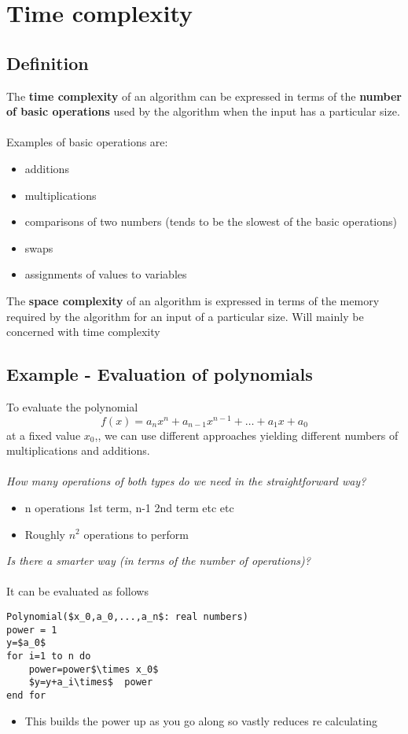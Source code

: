 \documentclass{article}[18pt]
\begin{document}
\section{Time complexity}
\subsection{Definition}
The \textbf{time complexity} of an algorithm can be expressed in terms
of the \textbf{number of basic operations} used by the algorithm when
the input has a particular size.\\
\\
Examples of basic operations are:
\begin{itemize}
	\item additions
	\item multiplications
	\item comparisons of two numbers (tends to be the slowest of the basic operations)
	\item swaps
	\item assignments of values to variables
\end{itemize}
The \textbf{space complexity} of an algorithm is expressed in terms of the memory required by the algorithm for an input of a particular size. Will mainly be concerned with time complexity
\subsection{Example - Evaluation of polynomials}
To evaluate the polynomial
$$f ( x ) = a _ { n } x ^ { n } + a _ { n - 1 } x ^ { n - 1 } + \ldots + a _ { 1 } x + a _ { 0 }$$
at a fixed value $x_0$,, we can use different approaches yielding
different numbers of multiplications and additions.\\
\\
\textit{How many operations of both types do we need in the
straightforward way?}
\begin{itemize}
	\item n operations 1st term, n-1 2nd term etc etc
	\item Roughly $n^2$ operations to perform
\end{itemize}
\textit{Is there a smarter way (in terms of the number of operations)?}\\
\\
It can be evaluated as follows
\begin{lstlisting}
Polynomial($x_0,a_0,...,a_n$: real numbers)
power = 1
y=$a_0$
for i=1 to n do
	power=power$\times x_0$
	$y=y+a_i\times$  power
end for
\end{lstlisting}
\begin{itemize}
	\item This builds the power up as you go along so vastly reduces re calculating
\end{itemize}
\end{document}
